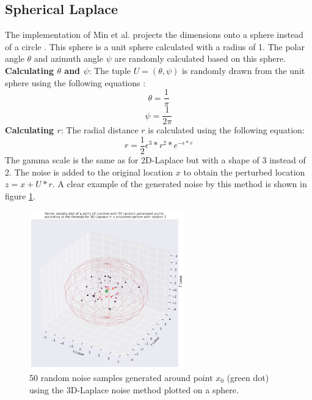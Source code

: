 \subsection{Spherical Laplace}
The implementation of Min et al. projects the dimensions onto a sphere instead of a circle \citep{9646489}.
This sphere is a unit sphere calculated with a radius of 1.
The polar angle $\theta$ and azimuth angle $\psi$ are randomly calculated based on this sphere. \newline
\textbf{Calculating $\theta$ and $\psi$}: The tuple $U = (\theta, \psi)$ is randomly drawn from the unit sphere using the following equations \citep{9646489}:
\begin{equation}
  \theta = \frac{1}{\pi}
\end{equation}
\begin{equation}
  \psi = \frac{1}{2\pi}
\end{equation}
\textbf{Calculating $r$}: The radial distance $r$ is calculated using the following equation:
\begin{equation}
  r = \frac{1}{2}\epsilon^3 * r^2 * e^{-\epsilon * r}
  \label{eq:3d-laplace-r}
\end{equation}
The gamma scale is the same as for 2D-Laplace but with a shape of 3 instead of 2.
The noise is added to the original location $x$ to obtain the perturbed location $z = x + U*r$.
A clear example of the generated noise by this method is shown in figure \ref{fig:3d-laplace-noise}.
\begin{figure}
  \includegraphics[width=0.6\textwidth]{TheorethicalFramework/ND-Laplace/Images/3d_laplace_noise.png}
  \caption{50 random noise samples generated around point $x_0$ (green dot) using the 3D-Laplace noise method \citep{9646489} plotted on a sphere.}
  \label{fig:3d-laplace-noise}
\end{figure}
